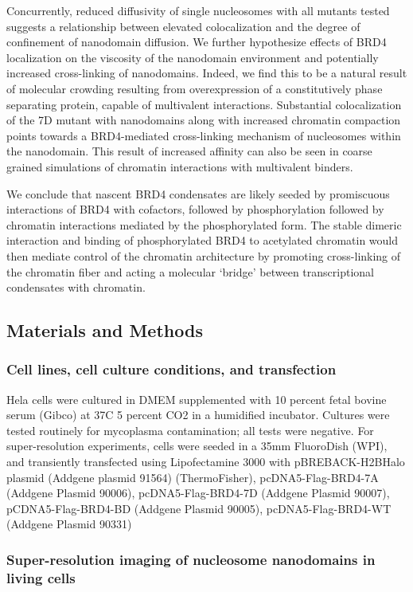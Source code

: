 Concurrently, reduced diffusivity of single nucleosomes with all mutants tested suggests a relationship between elevated colocalization and the degree of confinement of nanodomain diffusion. We further hypothesize effects of BRD4 localization on the viscosity of the nanodomain environment and potentially increased cross-linking of nanodomains. Indeed, we find this to be a natural result of molecular crowding resulting from overexpression of a constitutively phase separating protein, capable of multivalent interactions. Substantial colocalization of the 7D mutant with nanodomains along with increased chromatin compaction points towards a BRD4-mediated cross-linking mechanism of nucleosomes within the nanodomain. This result of increased affinity can also be seen in coarse grained simulations of chromatin interactions with multivalent binders. 

We conclude that nascent BRD4 condensates are likely seeded by promiscuous interactions of BRD4 with cofactors, followed by phosphorylation followed by chromatin interactions mediated by the phosphorylated form. The stable dimeric interaction and binding of phosphorylated BRD4 to acetylated chromatin would then mediate control of the chromatin architecture by promoting cross-linking of the chromatin fiber and acting a molecular ‘bridge’ between transcriptional condensates with chromatin. 


\subsection{Materials and Methods}

\subsubsection{Cell lines, cell culture conditions, and transfection}

Hela cells were cultured in DMEM supplemented with 10 percent fetal bovine serum (Gibco) at 37C 5 percent CO2 in a humidified incubator. Cultures were tested routinely for mycoplasma contamination; all tests were negative. For super-resolution experiments, cells were seeded in a 35mm FluoroDish (WPI), and transiently transfected using Lipofectamine 3000 with pBREBACK-H2BHalo plasmid (Addgene plasmid 91564) (ThermoFisher), pcDNA5-Flag-BRD4-7A (Addgene Plasmid 90006), pcDNA5-Flag-BRD4-7D (Addgene Plasmid 90007), pCDNA5-Flag-BRD4-BD (Addgene Plasmid 90005), pcDNA5-Flag-BRD4-WT (Addgene Plasmid 90331)

\subsubsection{Super-resolution imaging of nucleosome nanodomains in living cells}


